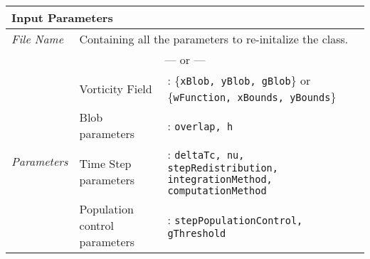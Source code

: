 	\begin{tabular}{l|lp{7cm}}
		\multicolumn{2}{l}{\textbf{Input Parameters}} & \\ \hline
		\textit{File Name} & \multicolumn{2}{l}{Containing all the parameters to re-initalize the class.} \\ \cline{2-3}
		\multicolumn{3}{c}{--- or ---} \\ \cline{2-3}
		\multirow{4}{*}{\textit{Parameters}} & Vorticity Field &: \{\texttt{xBlob, yBlob, gBlob}\} or \{\texttt{wFunction, xBounds, yBounds}\}\\ \cline{2-3}
		& Blob parameters &: \texttt{overlap, h} \\ \cline{2-3}
		& Time Step parameters &: \texttt{deltaTc, nu, stepRedistribution, integrationMethod, computationMethod}\\ \cline{2-3}
		& Population control parameters &: \texttt{stepPopulationControl, gThreshold}\\ \cline{2-3}
	\end{tabular}\\
	
